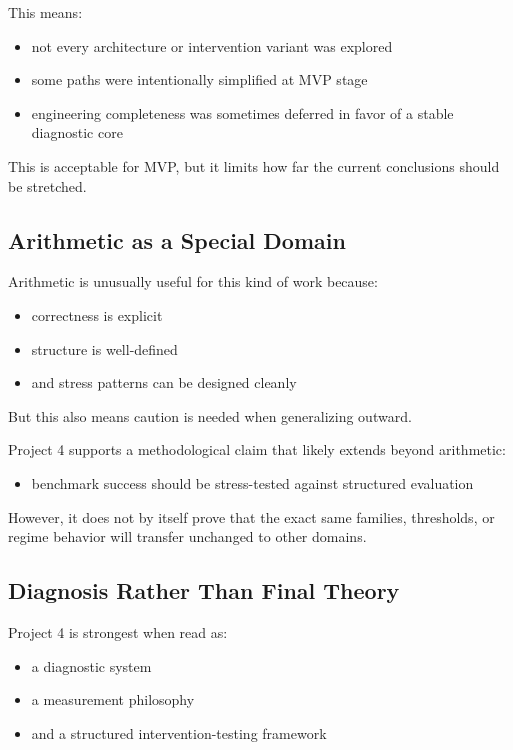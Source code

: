 \documentclass[11pt]{article}
\begin{document}
This means:
\begin{itemize}[leftmargin=1.5em]
    \item not every architecture or intervention variant was explored
    \item some paths were intentionally simplified at MVP stage
    \item engineering completeness was sometimes deferred in favor of a stable diagnostic core
\end{itemize}

This is acceptable for MVP, but it limits how far the current conclusions should be stretched.

\subsection{Arithmetic as a Special Domain}

Arithmetic is unusually useful for this kind of work because:
\begin{itemize}[leftmargin=1.5em]
    \item correctness is explicit
    \item structure is well-defined
    \item and stress patterns can be designed cleanly
\end{itemize}

But this also means caution is needed when generalizing outward.

Project 4 supports a methodological claim that likely extends beyond arithmetic:
\begin{itemize}[leftmargin=1.5em]
    \item benchmark success should be stress-tested against structured evaluation
\end{itemize}

However, it does not by itself prove that the exact same families, thresholds, or regime behavior will transfer unchanged to other domains.

\subsection{Diagnosis Rather Than Final Theory}

Project 4 is strongest when read as:
\begin{itemize}[leftmargin=1.5em]
    \item a diagnostic system
    \item a measurement philosophy
    \item and a structured intervention-testing framework
\end{itemize}
\end{document}
